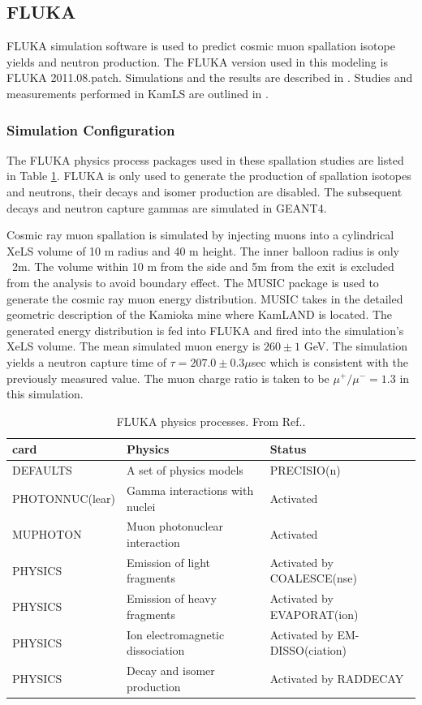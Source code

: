 \subsection{FLUKA}
FLUKA simulation software is used to predict cosmic muon spallation isotope yields and neutron production. The FLUKA version used in this modeling is FLUKA 2011.08.patch. Simulations and the results are described in \cite{klz_xenon_spallation}. Studies and measurements performed in KamLS are outlined in \cite{kamland_spallation_2009}.
\subsubsection*{Simulation Configuration}
The FLUKA physics process packages used in these spallation studies are listed in Table \ref{tab:fluka_process}. FLUKA is only used  to generate the production of spallation isotopes and neutrons, their decays and isomer production are disabled. The subsequent decays and neutron capture gammas are simulated in GEANT4. 

Cosmic ray muon spallation is simulated by injecting muons into a cylindrical XeLS volume of 10 m radius and 40 m height. The inner balloon radius is only ~2m. The volume within 10 m from the side and 5m from the exit is excluded from the analysis to avoid boundary effect. The MUSIC package is used to generate the cosmic ray muon energy distribution\cite{MUSIC}. MUSIC takes in the detailed geometric description of the Kamioka mine where KamLAND is located. The generated energy distribution is fed into FLUKA and fired into the simulation's XeLS volume. The mean simulated muon energy is $260\pm1$ GeV. The simulation yields a neutron capture time of $\tau=207.0\pm0.3\mu$sec which is consistent with the previously measured value. The muon charge ratio is taken to be $\mu^+/\mu^-=1.3$ in this simulation\cite{kamei_phd}.

\begin{table}[h]
\centering
\caption{FLUKA physics processes. From Ref.\cite{klz_xenon_spallation}.}
\label{tab:fluka_process}
\begin{tabular}{lll}
\hline
card & Physics & Status \\
\hline
DEFAULTS & A set of physics models & PRECISIO(n) \\
PHOTONNUC(lear) & Gamma interactions with nuclei & Activated \\
MUPHOTON & Muon photonuclear interaction & Activated \\
PHYSICS & Emission of light fragments & Activated by COALESCE(nse) \\
PHYSICS & Emission of heavy fragments & Activated by EVAPORAT(ion) \\
PHYSICS & Ion electromagnetic dissociation & Activated by EM-DISSO(ciation) \\
PHYSICS & Decay and isomer production & Activated by RADDECAY \\
\hline
\end{tabular}
\end{table}

